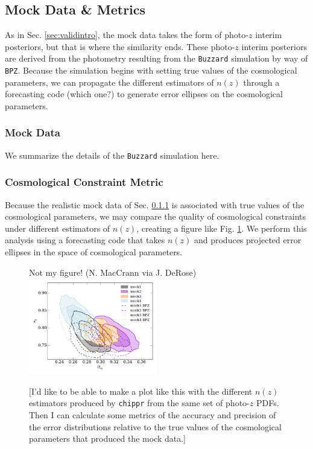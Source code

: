 \documentclass[iop]{emulateapj}
\begin{document}
\subsection{Mock Data \& Metrics}
\label{sec:appintro}

As in Sec. \ref{sec:validintro}, the mock data takes the form of photo-$z$ interim posteriors, but that is where the similarity ends.  These photo-$z$ interim posteriors are derived from the photometry resulting from the \texttt{Buzzard} simulation by way of \texttt{BPZ}.  Because the simulation begins with setting true values of the cosmological parameters, we can propagate the different estimators of $n(z)$ through a forecasting code (which one?) to generate error ellipses on the cosmological parameters.

\subsubsection{Mock Data}
\label{sec:buzzard}

We summarize the details of the \texttt{Buzzard} simulation here.

\subsubsection{Cosmological Constraint Metric}
\label{sec:cosmo}

Because the realistic mock data of Sec. \ref{sec:buzzard} is associated with true values of the cosmological parameters, we may compare the quality of cosmological constraints under different estimators of $n(z)$, creating a figure like Fig. \ref{fig:scgsr}.  We perform this analysis using a forecasting code that takes $n(z)$ and produces projected error ellipses in the space of cosmological parameters.  

\begin{figure}
	\begin{center}
		Not my figure! (N. MacCrann via J. DeRose)
		\includegraphics[width=0.5\textwidth]{cosmo_constraints.png}
		\caption{[I'd like to be able to make a plot like this with the different $n(z)$ estimators produced by \texttt{chippr} from the same set of photo-$z$ PDFs.  Then I can calculate some metrics of the accuracy and precision of the error distributions relative to the true values of the cosmological parameters that produced the mock data.]}
		\label{fig:scgsr}
	\end{center}
\end{figure}
\end{document}
